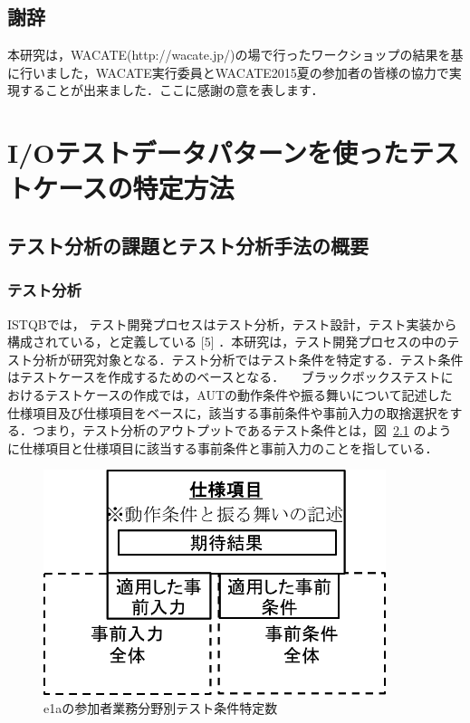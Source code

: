 \documentclass[a4paper,12pt]{jreport}
\begin{document}
\section{謝辞}
本研究は，WACATE(http://wacate.jp/)の場で行ったワークショップの結果を基に行いました，WACATE実行委員とWACATE2015夏の参加者の皆様の協力で実現することが出来ました．ここに感謝の意を表します．


\chapter{I/Oテストデータパターンを使ったテストケースの特定方法}

\section{テスト分析の課題とテスト分析手法の概要}
\subsection{テスト分析}
ISTQBでは， テスト開発プロセスはテスト分析，テスト設計，テスト実装から構成されている，と定義している [5] ．本研究は，テスト開発プロセスの中のテスト分析が研究対象となる．テスト分析ではテスト条件を特定する．テスト条件はテストケースを作成するためのベースとなる．
　ブラックボックステストにおけるテストケースの作成では，AUTの動作条件や振る舞いについて記述した仕様項目及び仕様項目をベースに，該当する事前条件や事前入力の取捨選択をする．つまり，テスト分析のアウトプットであるテスト条件とは，図~\ref{fig:D-4-Fig1} のように仕様項目と仕様項目に該当する事前条件と事前入力のことを指している．
\begin{figure}[h]
  \begin{center}
  \includegraphics[width=10cm]{./image/D-4-Fig1.png}
  \caption{e1aの参加者業務分野別テスト条件特定数}
  \label{fig:D-4-Fig1}
  \end{center}
   \end{figure}
\end{document}
